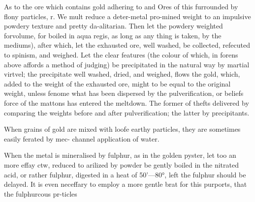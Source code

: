 As to the ore which contains gold adhering to and Ores of this furrounded by flony particles, r. We mult reduce a deter-metal pro-mined weight to an impulsive powdery texture and pretty da-alitarian. Then let the powdery weighted forvolume, for boiled in aqua regis, as long as any thing is taken, by the mediums), after which, let the exhausted ore, well washed, be collected, refecuted to spinism, and weighed. Let the clear features (the colour of which, in forens above affords a method of judging) be precipitated in the natural way by martial virtvel; the precipitate well washed, dried, and weighed, flows the gold, which, added to the weight of the exhausted ore, might to be equal to the original weight, unless fenome what has been dispersed by the pulverification, or beliefs force of the mattons has entered the meltdown. The former of thefts delivered by comparing the weights before and after pulverification; the latter by precipitants.\par\medskip
When grains of gold are mixed with loofe earthy particles, they are sometimes easily ferated by mec- channel application of water.\par\medskip
When the metal is mineralised by fulphur, as in the golden pyster, let too an more effay ctw, reduced to arilized by powder be gently boiled in the nitrated acid, or rather fulphur, digested in a heat of 50’—80°, left the fulphur should be delayed. It is even neceffary to employ a more gentle brat for this purports, that the fulphurcous pr-ticles\par\medskip
